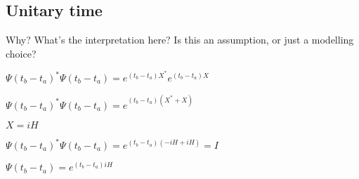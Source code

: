 
\subsection{Unitary time}

Why? What's the interpretation here? Is this an assumption, or just a modelling choice?

\(\Psi (t_b-t_a)^* \Psi (t_b-t_a)=e^{(t_b-t_a)X^*} e^{(t_b-t_a)X}\)

\(\Psi (t_b-t_a)^* \Psi (t_b-t_a)=e^{(t_b-t_a)(X^*+X)}\)

\(X=iH\)

\(\Psi (t_b-t_a)^* \Psi (t_b-t_a)=e^{(t_b-t_a)(-iH+iH)}=I\)

\(\Psi (t_b-t_a)=e^{(t_b-t_a)iH}\)

